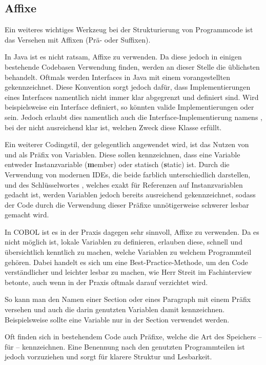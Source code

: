 \subsection{Affixe} \label{affix}\label{affixCOBOL}
Ein weiteres wichtiges Werkzeug bei der Strukturierung von Programmcode ist das Versehen mit Affixen (Prä- oder Suffixen).

In Java ist es nicht ratsam, Affixe zu verwenden. Da diese jedoch in einigen bestehende Codebasen Verwendung finden, werden an dieser Stelle die üblichsten behandelt.
Oftmals werden Interfaces in Java mit einem vorangestellten  gekennzeichnet. Diese Konvention sorgt jedoch dafür, dass Implementierungen eines Interfaces namentlich nicht immer klar abgegrenzt und definiert sind. Wird beispielsweise ein Interface  definiert, so könnten valide Implementierungen  oder  sein. Jedoch erlaubt dies namentlich auch die Interface-Implementierung namens , bei der nicht ausreichend klar ist, welchen Zweck diese Klasse erfüllt.

Ein weiterer Codingstil, der gelegentlich angewendet wird, ist das Nutzen von  und  als Präfix von Variablen. Diese sollen kennzeichnen, dass eine Variable entweder Instanzvariable (\textbf{m}ember) oder statisch (\textbf{s}tatic) ist. Durch die Verwendung von modernen IDEs, die beide farblich unterschiedlich darstellen, und des Schlüsselwortes , welches exakt für Referenzen auf Instanzvariablen gedacht ist, werden Variablen jedoch bereits ausreichend gekennzeichnet, sodass der Code durch die Verwendung dieser Präfixe unnötigerweise schwerer lesbar gemacht wird.

In COBOL ist es in der Praxis dagegen sehr sinnvoll, Affixe zu verwenden. Da es nicht möglich ist, lokale Variablen zu definieren, erlauben diese, schnell und übersichtlich kenntlich zu machen, welche Variablen zu welchem Programmteil gehören. Dabei handelt es sich um eine Best-Practice-Methode, um den Code verständlicher und leichter lesbar zu machen, wie Herr Streit im Fachinterview betonte, auch wenn in der Praxis oftmals darauf verzichtet wird.

So kann man den Namen einer Section oder eines Paragraph mit einem Präfix versehen und auch die darin genutzten Variablen damit kennzeichnen. Beispielsweise sollte eine Variable  nur in der Section  verwendet werden. 

Oft finden sich in bestehendem Code auch Präfixe, welche die Art des Speichers -- \zB {} für  -- kennzeichnen. Eine Benennung nach den genutzten Programmteilen ist jedoch vorzuziehen und sorgt für klarere Struktur und Lesbarkeit.

